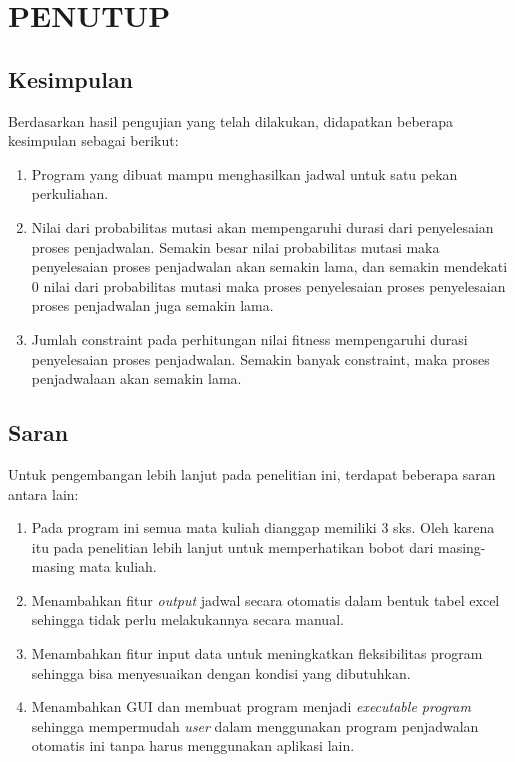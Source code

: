 \chapter{PENUTUP}
\label{chap:penutup}


\section{Kesimpulan}
\label{sec:kesimpulan}

Berdasarkan hasil pengujian yang telah dilakukan, didapatkan beberapa kesimpulan \linebreak sebagai berikut:

\begin{enumerate}[nolistsep]

  \item Program yang dibuat mampu menghasilkan jadwal untuk satu pekan perkuliahan.
  \item Nilai dari probabilitas mutasi akan mempengaruhi durasi dari penyelesaian proses \linebreak penjadwalan. 
        Semakin besar nilai probabilitas mutasi maka penyelesaian proses penjadwalan akan semakin lama, dan semakin mendekati 0 nilai dari probabilitas mutasi maka proses penyelesaian proses penyelesaian proses penjadwalan juga semakin lama.
  \item Jumlah constraint pada perhitungan nilai fitness mempengaruhi durasi penyelesaian \linebreak proses penjadwalan. 
        Semakin banyak constraint, maka proses penjadwalaan akan \linebreak semakin lama.

\end{enumerate}

\section{Saran}
\label{chap:saran}

Untuk pengembangan lebih lanjut pada penelitian ini, terdapat beberapa saran antara lain:

\begin{enumerate}[nolistsep]
  \item Pada program ini semua mata kuliah dianggap memiliki 3 sks. Oleh karena itu pada penelitian lebih lanjut untuk memperhatikan bobot dari masing-masing mata kuliah.
  \item Menambahkan fitur \emph{output} jadwal secara otomatis dalam bentuk tabel excel sehingga tidak perlu melakukannya secara manual.
  \item Menambahkan fitur input data untuk meningkatkan fleksibilitas program sehingga bisa menyesuaikan dengan kondisi yang dibutuhkan.
  \item Menambahkan GUI dan membuat program menjadi \emph{executable program} sehingga \linebreak mempermudah \emph{user} dalam menggunakan program penjadwalan otomatis ini tanpa harus menggunakan aplikasi lain.
\end{enumerate}
